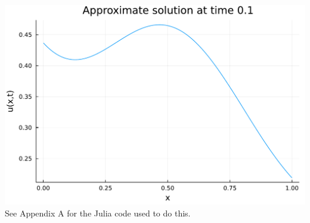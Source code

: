 \documentclass{article}
\begin{document}
\includegraphics[scale=0.5]{p2_3.pdf}\\
See Appendix A for the Julia code used to do this. 
\end{document}
